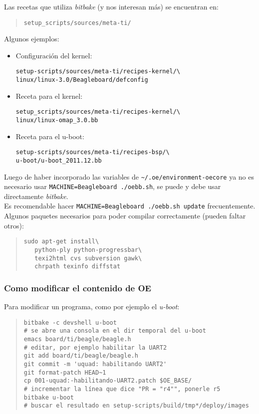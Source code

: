 \documentclass[main]{subfiles}
\begin{document}
Las recetas que utiliza \textit{bitbake} (y nos interesan más) se encuentran en:
\begin{quote}
\begin{verbatim}
setup_scripts/sources/meta-ti/
\end{verbatim}
\end{quote}
Algunos ejemplos:
\begin{itemize}
\item Configuración del kernel:
\begin{verbatim}
setup-scripts/sources/meta-ti/recipes-kernel/\
linux/linux-3.0/Beagleboard/defconfig
\end{verbatim}
\item Receta para el kernel:
\begin{verbatim}
setup_scripts/sources/meta-ti/recipes-kernel/\
linux/linux-omap_3.0.bb
\end{verbatim}
\item Receta para el u-boot:
\begin{verbatim}
setup-scripts/sources/meta-ti/recipes-bsp/\
u-boot/u-boot_2011.12.bb
\end{verbatim}
\end{itemize}

Luego de haber incorporado las variables de \verb+~/.oe/environment-oecore+ ya no es necesario usar \verb+MACHINE=Beagleboard ./oebb.sh+, se puede y debe usar directamente \textit{bitbake}.\\

Es recomendable hacer \verb+MACHINE=Beagleboard ./oebb.sh update+ frecuentemente.
Algunos paquetes necesarios para poder compilar correctamente (pueden faltar otros):
\begin{quote}
\begin{verbatim}
sudo apt-get install\
   python-ply python-progressbar\
   texi2html cvs subversion gawk\
   chrpath texinfo diffstat
\end{verbatim}
\end{quote}

\subsubsection{Como modificar el contenido de OE}
\label{sec:codigo:como-modificar-el-contenido-de-oe}

Para modificar un programa, como por ejemplo el \textit{u-boot}:
\begin{quote}
\begin{verbatim}
bitbake -c devshell u-boot
# se abre una consola en el dir temporal del u-boot
emacs board/ti/beagle/beagle.h
# editar, por ejemplo habilitar la UART2
git add board/ti/beagle/beagle.h
git commit -m 'uquad: habilitando UART2'
git format-patch HEAD~1
cp 001-uquad:-habilitando-UART2.patch $OE_BASE/
# incrementar la línea que dice "PR = "r4"", ponerle r5
bitbake u-boot
# buscar el resultado en setup-scripts/build/tmp*/deploy/images
\end{verbatim}
\end{quote}
\end{document}
